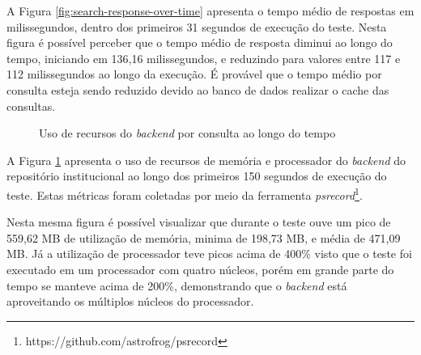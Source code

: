 A Figura \ref{fig:search-response-over-time} apresenta o tempo médio de respostas
em milissegundos, dentro dos primeiros 31 segundos de execução do teste. Nesta figura
é possível perceber que o tempo médio de resposta diminui ao longo do tempo, iniciando
em 136,16 milissegundos, e reduzindo para valores entre 117 e 112 milissegundos ao longo
da execução. É provável que o tempo médio por consulta esteja sendo reduzido devido ao
banco de dados realizar o cache das consultas.

\begin{figure}[H]
    \caption{Uso de recursos do \emph{backend} por consulta ao longo do tempo}
    \centering
    \label{fig:resource-usage-advanced-search}
\end{figure}

A Figura \ref{fig:resource-usage-advanced-search} apresenta o uso de recursos
de memória e processador do \emph{backend} do repositório institucional ao longo
dos primeiros 150 segundos de execução do teste. Estas métricas foram coletadas por
meio da ferramenta \emph{psrecord}\footnote{https://github.com/astrofrog/psrecord}.

Nesta mesma figura é possível visualizar que durante o teste ouve um pico de 559,62 MB
de utilização de memória, minima de 198,73 MB, e média de 471,09 MB. Já a utilização de
processador teve picos acima de 400\% visto que o teste foi executado em um
processador com quatro núcleos, porém em grande parte do tempo se manteve acima de 200\%,
demonstrando que o \emph{backend} está aproveitando os múltiplos núcleos do processador.

